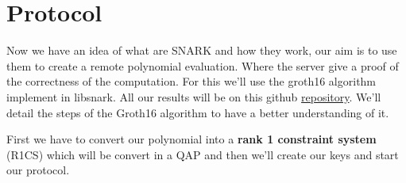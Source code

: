 \section{Protocol}
Now we have an idea of what are SNARK and how they work, our aim is to use them to create a remote polynomial evaluation. Where the server give a proof of the correctness of the computation. For this we'll use the groth16 algorithm implement in libsnark. All our results will be on this github \href{https://github.com/ruscot/snark-protocol-experiment}{repository}. We'll detail the steps of the Groth16 algorithm to have a better understanding of it.

First we have to convert our polynomial into a \textbf{rank 1 constraint system} (R1CS) which will be convert in a QAP and then we'll create our keys and start our protocol.


%




